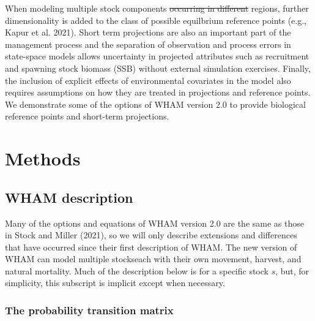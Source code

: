 \documentclass[
]{article}
\makeatletter
\providecommand{\DIFaddtex}[1]{{\protect\color{blue}\uwave{#1}}} %
\providecommand{\DIFdeltex}[1]{{\protect\color{red}\sout{#1}}} %
\providecommand{\DIFaddbegin}{} %
\providecommand{\DIFaddend}{} %
\providecommand{\DIFdelbegin}{} %
\providecommand{\DIFdelend}{} %
\providecommand{\DIFadd}[1]{\texorpdfstring{\DIFaddtex{#1}}{#1}} %
\providecommand{\DIFdel}[1]{\texorpdfstring{\DIFdeltex{#1}}{}} %
\newcommand{\DIFscaledelfig}{0.5}
\newlength{\DIFdelgraphicswidth} %
\newlength{\DIFdelgraphicsheight} %
\newcommand{\DIFaddincludegraphics}[2][]{{\color{blue}\fbox{\DIFOincludegraphics[#1]{#2}}}} %
\newcommand{\DIFdelincludegraphics}[2][]{%
\sbox{\DIFdelgraphicsbox}{\DIFOincludegraphics[#1]{#2}}%
\settoboxwidth{\DIFdelgraphicswidth}{\DIFdelgraphicsbox} %
\settoboxtotalheight{\DIFdelgraphicsheight}{\DIFdelgraphicsbox} %
\scalebox{\DIFscaledelfig}{%
\parbox[b]{\DIFdelgraphicswidth}{\usebox{\DIFdelgraphicsbox}\\[-\baselineskip] \rule{\DIFdelgraphicswidth}{0em}}\llap{\resizebox{\DIFdelgraphicswidth}{\DIFdelgraphicsheight}{%
\setlength{\unitlength}{\DIFdelgraphicswidth}%
\begin{picture}(1,1)%
\thicklines\linethickness{2pt} %
{\color[rgb]{1,0,0}\put(0,0){\framebox(1,1){}}}%
{\color[rgb]{1,0,0}\put(0,0){\line( 1,1){1}}}%
{\color[rgb]{1,0,0}\put(0,1){\line(1,-1){1}}}%
\end{picture}%
}\hspace*{3pt}}} %
} %
\DeclareRobustCommand{\DIFaddbegin}{\DIFOaddbegin \let\includegraphics\DIFaddincludegraphics} %
\DeclareRobustCommand{\DIFaddend}{\DIFOaddend \let\includegraphics\DIFOincludegraphics} %
\DeclareRobustCommand{\DIFdelbegin}{\DIFOdelbegin \let\includegraphics\DIFdelincludegraphics} %
\DeclareRobustCommand{\DIFdelend}{\DIFOaddend \let\includegraphics\DIFOincludegraphics} %
\let\sout@orig\sout %
\renewcommand{\sout}[1]{\ifmmode\text{\sout@orig{\ensuremath{#1}}}\else\sout@orig{#1}\fi} %
\makeatother
\begin{document}
When modeling multiple stock components \DIFdelbegin \DIFdel{occurring in different }\DIFdelend \DIFaddbegin \DIFadd{and }\DIFaddend regions, further dimensionality is added to the class of possible equilbrium reference points (e.g., Kapur et al. 2021). Short term projections are also an important part of the management process and the separation of observation and process errors in state-space models allows uncertainty in projected attributes such as recruitment and spawning stock biomass (SSB) without external simulation exercises. Finally, the inclusion of explicit effects of environmental covariates in the model also requires assumptions on how they are treated in projections and reference points. We demonstrate some of the options of WHAM version 2.0 to provide biological reference points and short-term projections.

\hypertarget{methods}{%
\section*{Methods}\label{methods}}

\hypertarget{wham-description}{%
\subsection*{WHAM description}\label{wham-description}}

Many of the options and equations of WHAM version 2.0 are the same as those in Stock and Miller (2021), so we will only describe extensions and differences that have occurred since their first description of WHAM. The new version of WHAM can model multiple stocks\DIFaddbegin \DIFadd{, }\DIFaddend each with their own movement, harvest, and natural mortality. Much of the description below is for a specific stock \(s\), but, for simplicity, this subscript is implicit except when necessary.

\hypertarget{the-probability-transition-matrix}{%
\subsubsection*{The probability transition matrix}\label{the-probability-transition-matrix}}
\end{document}
